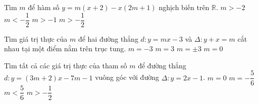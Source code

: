 \begin{ex}%
    Tìm $m$ để hàm số $y=m(x+2)-x(2m+1)$ nghịch biến trên $\mathbb{R}$.
    \choice
    {$m>-2$}
    {$m<-\dfrac{1}{2}$}
    {\True $m>-1$}
    {$m>-\dfrac{1}{2}$}
\end{ex}

\begin{ex}%
    Tìm giá trị thực của $m$ để hai đường thẳng $d\colon y=mx-3$ và $\Delta\colon y+x=m$ cắt nhau tại một điểm nằm trên trục tung.
    \choice
    {\True $m=-3$}
    {$m=3$}
    {$m=\pm 3$}
    {$m=0$}
\end{ex}

\begin{ex}%
    Tìm tất cả các giá trị thực của tham số $m$ để đường thẳng $d\colon y=(3m+2)x-7m-1$ vuông góc với đường $\Delta\colon y=2x-1$.
    \choice
    {$m=0$}
    {\True $m=-\dfrac{5}{6}$}
    {$m<\dfrac{5}{6}$}
    {$m>-\dfrac{1}{2}$}
\end{ex}

